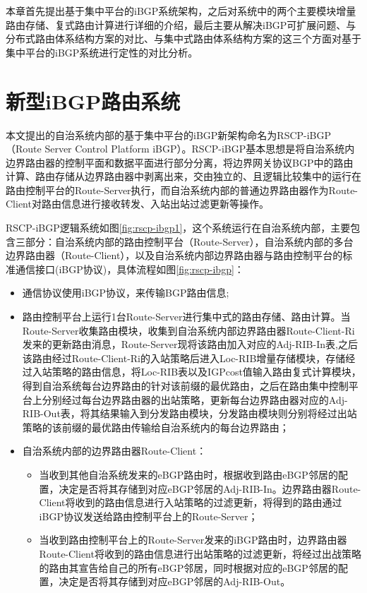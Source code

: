 本章首先提出基于集中平台的iBGP系统架构，之后对系统中的两个主要模块增量路由存储、复式路由计算进行详细的介绍，最后主要从解决iBGP可扩展问题、与分布式路由体系结构方案的对比、与集中式路由体系结构方案的这三个方面对基于集中平台的iBGP系统进行定性的对比分析。








\section{新型iBGP路由系统}
本文提出的自治系统内部的基于集中平台的iBGP新架构命名为RSCP-iBGP（Route Server Control Platform iBGP）。RSCP-iBGP基本思想是将自治系统内边界路由器的控制平面和数据平面进行部分分离，将边界网关协议BGP中的路由计算、路由存储从边界路由器中剥离出来，交由独立的、且逻辑比较集中的运行在路由控制平台的Route-Server执行，而自治系统内部的普通边界路由器作为Route-Client对路由信息进行接收转发、入站出站过滤更新等操作。

RSCP-iBGP逻辑系统如图\ref{fig:rscp-ibgp1}，这个系统运行在自治系统内部，主要包含三部分：自治系统内部的路由控制平台（Route-Server），自治系统内部的多台边界路由器（Route-Client），以及自治系统内部边界路由器与路由控制平台的标准通信接口(iBGP协议)，具体流程如图\ref{fig:rscp-ibgp}：
\begin{itemize}
  \item 通信协议使用iBGP协议，来传输BGP路由信息;
  \item 路由控制平台上运行1台Route-Server进行集中式的路由存储、路由计算。当Route-Server收集路由模块，收集到自治系统内部边界路由器Route-Client-Ri发来的更新路由消息，Route-Server现将该路由加入对应的Adj-RIB-In表,之后该路由经过Route-Client-Ri的入站策略后进入Loc-RIB增量存储模块，存储经过入站策略的路由信息，将Loc-RIB表以及IGPcost值输入路由复式计算模块，得到自治系统每台边界路由的针对该前缀的最优路由，之后在路由集中控制平台上分别经过每台边界路由器的出站策略，更新每台边界路由器对应的Adj-RIB-Out表，将其结果输入到分发路由模块，分发路由模块则分别将经过出站策略的该前缀的最优路由传输给自治系统内的每台边界路由；
  \item 自治系统内部的边界路由器Route-Client：
        \begin{itemize}
          \item 当收到其他自治系统发来的eBGP路由时，根据收到路由eBGP邻居的配置，决定是否将其存储到对应eBGP邻居的Adj-RIB-In。边界路由器Route-Client将收到的路由信息进行入站策略的过滤更新，将得到的路由通过iBGP协议发送给路由控制平台上的Route-Server；
          \item 当收到路由控制平台上的Route-Server发来的iBGP路由时，边界路由器Route-Client将收到的路由信息进行出站策略的过滤更新，将经过出战策略的路由其宣告给自己的所有eBGP邻居，同时根据对应的eBGP邻居的配置，决定是否将其存储到对应eBGP邻居的Adj-RIB-Out。
        \end{itemize}
\end{itemize}

